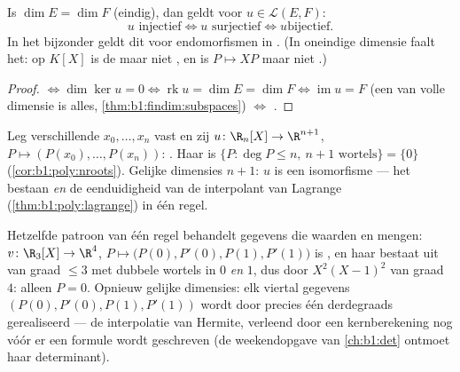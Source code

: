 \begin{corollary}\label{cor:b1:linmaps:samedim}
Is $\dim E = \dim F$ (eindig), dan geldt voor $u \in \mathcal{L}(E,
F)$:
\[
u \text{ injectief} \iff u \text{ surjectief} \iff u \text{
bijectief}.
\]
In het bijzonder geldt dit voor endomorfismen in .
(In oneindige dimensie faalt het: op $K[X]$ is de 
 maar niet , en is $P \mapsto XP$  maar
niet .)
\end{corollary}

\begin{proof}
 $\iff \dim\ker u = 0 \iff \operatorname{rk} u = \dim E =
\dim F \iff \operatorname{im} u = F$ (een  van volle
dimensie is alles, \cref{thm:b1:findim:subspaces}) $\iff$
.
\end{proof}

\begin{example}\label{ex:b1:linmaps:interpolation}
Leg verschillende $x_0, \dots, x_n$ vast en zij $u \colon \R_n[X]
\to \R^{n+1}$, $P \mapsto (P(x_0), \dots, P(x_n))$: . Haar
 is $\{P : \deg P \leq n,\ n+1 \text{ wortels}\} = \{0\}$
(\cref{cor:b1:poly:nroots}). Gelijke dimensies $n + 1$: $u$ is een
isomorfisme --- het bestaan \emph{en} de eenduidigheid van de
interpolant van Lagrange (\cref{thm:b1:poly:lagrange}) in één
regel.

Hetzelfde patroon van één regel behandelt gegevens die waarden en
 mengen: $v \colon \R_3[X] \to \R^4$, $P \mapsto
\bigl(P(0), P'(0), P(1), P'(1)\bigr)$ is , en haar 
bestaat uit  van graad $\leq 3$ met dubbele wortels in
$0$ \emph{en} $1$, dus  door $X^2(X-1)^2$ van graad $4$:
alleen $P = 0$. Opnieuw gelijke dimensies: elk viertal gegevens
$(P(0), P'(0), P(1), P'(1))$ wordt door precies één derdegraads
 gerealiseerd --- de interpolatie van Hermite, verleend
door een kernberekening nog vóór er een formule wordt geschreven
(de weekendopgave van \cref{ch:b1:det} ontmoet haar determinant).
\end{example}

